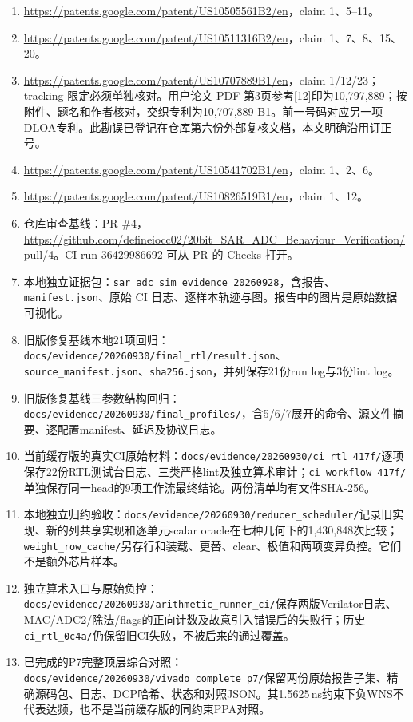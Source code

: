 \documentclass[UTF8,fontset=fandol,11pt,a4paper,openany]{ctexrep}
\newcommand{\code}[1]{\nolinkurl{#1}}
\begin{document}
\begin{enumerate}
\item [10] \url{https://patents.google.com/patent/US10505561B2/en}，claim 1、5--11。
\item [11] \url{https://patents.google.com/patent/US10511316B2/en}，claim 1、7、8、15、20。
\item [12] \url{https://patents.google.com/patent/US10707889B1/en}，claim 1/12/23；tracking 限定必须单独核对。用户论文 PDF 第3页参考[12]印为10,797,889；按附件、题名和作者核对，交织专利为10,707,889 B1。前一号码对应另一项DLOA专利。此勘误已登记在仓库第六份外部复核文档，本文明确沿用订正号。
\item [13] \url{https://patents.google.com/patent/US10541702B1/en}，claim 1、2、6。
\item [14] \url{https://patents.google.com/patent/US10826519B1/en}，claim 1、12。
\item 仓库审查基线：PR \#4，\url{https://github.com/defineiocc02/20bit_SAR_ADC_Behaviour_Verification/pull/4}。CI run 36429986692 可从 PR 的 Checks 打开。
\item 本地独立证据包：\code{sar_adc_sim_evidence_20260928}，含报告、\code{manifest.json}、原始 CI 日志、逐样本轨迹与图。报告中的图片是原始数据可视化。
\item 旧版修复基线本地21项回归：\code{docs/evidence/20260930/final_rtl/result.json}、\code{source_manifest.json}、\code{sha256.json}，并列保存21份run log与3份lint log。
\item 旧版修复基线三参数结构回归：\code{docs/evidence/20260930/final_profiles/}，含5/6/7展开的命令、源文件摘要、逐配置manifest、延迟及协议日志。
\item 当前缓存版的真实CI原始材料：\code{docs/evidence/20260930/ci_rtl_417f/}逐项保存22份RTL测试台日志、三类严格lint及独立算术审计；\code{ci_workflow_417f/}单独保存同一head的9项工作流最终结论。两份清单均有文件SHA-256。
\item 本地独立归约验收：\code{docs/evidence/20260930/reducer_scheduler/}记录旧实现、新的列共享实现和逐单元scalar oracle在七种几何下的1,430,848次比较；\code{weight_row_cache/}另存行和装载、更替、clear、极值和两项变异负控。它们不是额外芯片样本。
\item 独立算术入口与原始负控：\code{docs/evidence/20260930/arithmetic_runner_ci/}保存两版Verilator日志、MAC/ADC2/除法/flags的正向计数及故意引入错误后的失败行；历史\code{ci_rtl_0c4a/}仍保留旧CI失败，不被后来的通过覆盖。
\item 已完成的P7完整顶层综合对照：\code{docs/evidence/20260930/vivado_complete_p7/}保留两份原始报告子集、精确源码包、日志、DCP哈希、状态和对照JSON。其1.5625\,ns约束下负WNS不代表达频，也不是当前缓存版的同约束PPA对照。

\end{enumerate}
\end{document}
